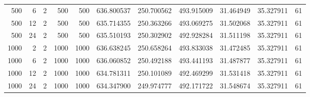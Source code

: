 \begin{table}
\begin{tabular}{rrrrrrrrrrr}
500 & 6 & 2 & 500 & 500 & 636.800537 & 250.700562 & 493.915009 & 31.464949 & 35.327911 & 61 \\
500 & 12 & 2 & 500 & 500 & 635.714355 & 250.363266 & 493.069275 & 31.502068 & 35.327911 & 61 \\
500 & 24 & 2 & 500 & 500 & 635.510193 & 250.302902 & 492.928284 & 31.511198 & 35.327911 & 61 \\
1000 & 2 & 2 & 1000 & 1000 & 636.638245 & 250.658264 & 493.833038 & 31.472485 & 35.327911 & 61 \\
1000 & 6 & 2 & 1000 & 1000 & 636.060852 & 250.492188 & 493.441193 & 31.487877 & 35.327911 & 61 \\
1000 & 12 & 2 & 1000 & 1000 & 634.781311 & 250.101089 & 492.469299 & 31.531418 & 35.327911 & 61 \\
1000 & 24 & 2 & 1000 & 1000 & 634.347900 & 249.974777 & 492.171722 & 31.548674 & 35.327911 & 61 \\
\bottomrule
\end{tabular}
\end{table}

